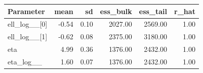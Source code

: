 \begin{table}[htbp]
\centering
{}
\label{tab:hsgp_sea_params}
\small
\begin{tabular}{lrrrrr}
\toprule
\textbf{Parameter} & \textbf{mean} & \textbf{sd} & \textbf{ess\_bulk} & \textbf{ess\_tail} & \textbf{r\_hat} \\
\midrule
ell\_log\_\_[0] & -0.54 & 0.10 & 2027.00 & 2569.00 & 1.00 \\
ell\_log\_\_[1] & -0.62 & 0.08 & 2375.00 & 3180.00 & 1.00 \\
eta & 4.99 & 0.36 & 1376.00 & 2432.00 & 1.00 \\
eta\_log\_\_ & 1.60 & 0.07 & 1376.00 & 2432.00 & 1.00 \\
\bottomrule
\end{tabular}
\end{table}
